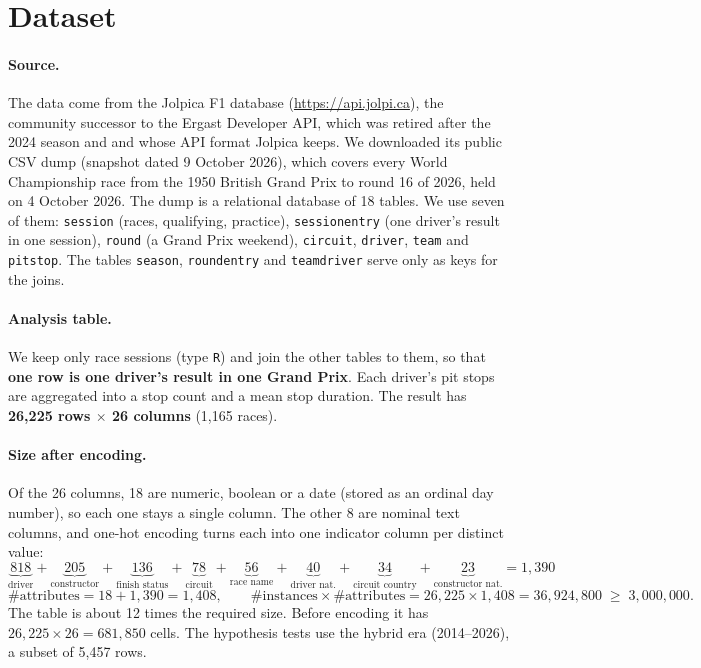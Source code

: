 \section{Dataset}

\paragraph{Source.} The data come from the Jolpica F1 database (\url{https://api.jolpi.ca}), the
community successor to the Ergast Developer API, which was retired after the 2024 season and and whose API
format Jolpica keeps. We downloaded its public CSV dump (snapshot dated 9 October 2026), which covers every World
Championship race from the 1950 British Grand Prix to round 16 of 2026, held on 4 October 2026. The dump is a relational database of 18 tables. We use
seven of them: \texttt{session} (races, qualifying, practice), \texttt{sessionentry} (one driver's result in one
session), \texttt{round} (a Grand Prix weekend), \texttt{circuit}, \texttt{driver}, \texttt{team} and
\texttt{pitstop}. The tables \texttt{season}, \texttt{roundentry} and \texttt{teamdriver} serve only as keys
for the joins.

\paragraph{Analysis table.} We keep only race sessions (type \texttt{R}) and join the other tables to them, so that
\textbf{one row is one driver's result in one Grand Prix}. Each driver's pit stops are aggregated into a stop
count and a mean stop duration. The result has \textbf{26{,}225 rows $\times$ 26 columns} (1{,}165 races).

\paragraph{Size after encoding.} Of the 26 columns, 18 are numeric, boolean or a date (stored as an ordinal day
number), so each one stays a single column. The other 8 are nominal text columns, and one-hot encoding turns each
into one indicator column per distinct value:
\[
\underbrace{818}_{\text{driver}}+\underbrace{205}_{\text{constructor}}+\underbrace{136}_{\text{finish status}}
+\underbrace{78}_{\text{circuit}}+\underbrace{56}_{\text{race name}}+\underbrace{40}_{\text{driver nat.}}
+\underbrace{34}_{\text{circuit country}}+\underbrace{23}_{\text{constructor nat.}} = 1{,}390
\]
\[
\#\text{attributes} = 18 + 1{,}390 = 1{,}408,\qquad
\#\text{instances}\times\#\text{attributes} = 26{,}225 \times 1{,}408 = 36{,}924{,}800 \;\geq\; 3{,}000{,}000.
\]
The table is about 12 times the required size. Before encoding it has
$26{,}225 \times 26 = 681{,}850$ cells. The hypothesis tests use the hybrid era (2014--2026), a subset of 5{,}457 rows.


